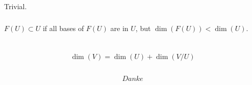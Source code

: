 \documentclass{report}
\begin{document}
\section{}

\subsection{}
Trivial.

\subsection{}

$F(U)\subset U$ if all bases of $F(U)$ are in $U$, but $\dim(F(U))< \dim(U)$.

\chapter{}

\section{}

$$\dim(V)=\dim(U)+\dim(V/U)$$

\section{}

$$Danke$$

\subsection{}

\subsection{}

\subsection{}

\subsection{}

\section{}
\end{document}
